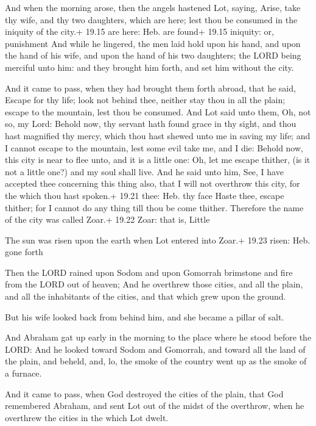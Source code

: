  And when the morning arose, then the angels hastened
Lot, saying, Arise, take thy wife, and thy two daughters, which are
here; lest thou be consumed in the iniquity of the city.+ 19.15 are
here: Heb. are found+ 19.15 iniquity: or, punishment  And
while he lingered, the men laid hold upon his hand, and upon the hand of
his wife, and upon the hand of his two daughters; the LORD being
merciful unto him: and they brought him forth, and set him without the
city.

 And it came to pass, when they had brought them forth
abroad, that he said, Escape for thy life; look not behind thee, neither
stay thou in all the plain; escape to the mountain, lest thou be
consumed.  And Lot said unto them, Oh, not so, my Lord:
 Behold now, thy servant hath found grace in thy sight, and
thou hast magnified thy mercy, which thou hast shewed unto me in saving
my life; and I cannot escape to the mountain, lest some evil take me,
and I die:  Behold now, this city is near to flee unto, and
it is a little one: Oh, let me escape thither, (is it not a little one?)
and my soul shall live.  And he said unto him, See, I have
accepted thee concerning this thing also, that I will not overthrow this
city, for the which thou hast spoken.+ 19.21 thee: Heb. thy face
 Haste thee, escape thither; for I cannot do any thing till
thou be come thither. Therefore the name of the city was called Zoar.+
19.22 Zoar: that is, Little

 The sun was risen upon the earth when Lot entered into
Zoar.+ 19.23 risen: Heb. gone forth

 Then the LORD rained upon Sodom and upon Gomorrah
brimstone and fire from the LORD out of heaven;  And he
overthrew those cities, and all the plain, and all the inhabitants of
the cities, and that which grew upon the ground.

 But his wife looked back from behind him, and she became
a pillar of salt.

 And Abraham gat up early in the morning to the place
where he stood before the LORD:  And he looked toward Sodom
and Gomorrah, and toward all the land of the plain, and beheld, and, lo,
the smoke of the country went up as the smoke of a furnace.

 And it came to pass, when God destroyed the cities of
the plain, that God remembered Abraham, and sent Lot out of the midst of
the overthrow, when he overthrew the cities in the which Lot dwelt.

